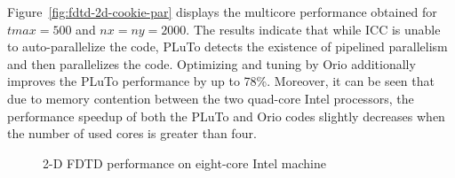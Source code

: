 Figure~\ref{fig:fdtd-2d-cookie-par} displays the multicore performance
obtained for $tmax=500$ and $nx=ny=2000$. The results indicate that
while ICC is unable to auto-parallelize the code, PLuTo detects the
existence of pipelined parallelism and then parallelizes the
code. Optimizing and tuning by Orio additionally improves the PLuTo
performance by up to 78\%. Moreover, it can be seen that due to memory
contention between the two quad-core Intel processors, the performance
speedup of both the PLuTo and Orio codes slightly decreases when the
number of used cores is greater than four.
 
\begin{figure}[htb] 
\begin{center} 
    
\end{center}
\vspace{-.2in} 
\caption{2-D FDTD performance on eight-core Intel machine} 
\label{fig:fdtd-2d-cookie-results} 
\vspace{-.2in}
\end{figure} 

 
